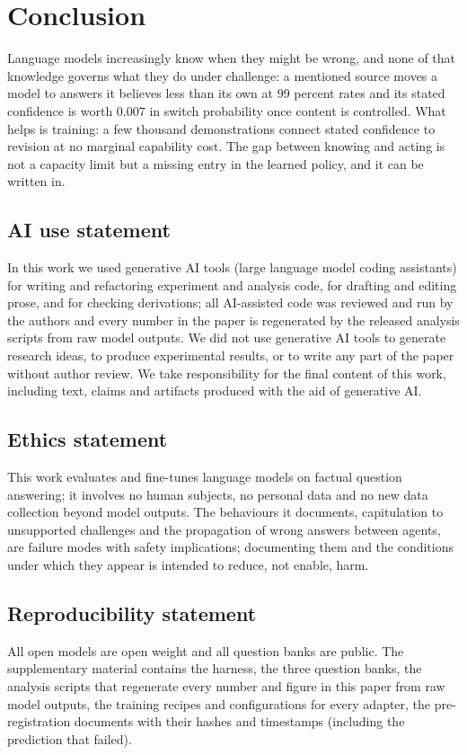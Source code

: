 \documentclass{article}
\begin{document}
\section{Conclusion}
\label{sec:conclusion}
Language models increasingly know when they might be wrong, and none of that knowledge governs what they do under challenge: a mentioned source moves a model to answers it believes less than its own at 99 percent rates and its stated confidence is worth $0.007$ in switch probability once content is controlled. What helps is training: a few thousand demonstrations connect stated confidence to revision at no marginal capability cost. The gap between knowing and acting is not a capacity limit but a missing entry in the learned policy, and it can be written in.


\subsection*{AI use statement}
In this work we used generative AI tools (large language model coding assistants) for writing and refactoring experiment and analysis code, for drafting and editing prose, and for checking derivations; all AI-assisted code was reviewed and run by the authors and every number in the paper is regenerated by the released analysis scripts from raw model outputs. We did not use generative AI tools to generate research ideas, to produce experimental results, or to write any part of the paper without author review. We take responsibility for the final content of this work, including text, claims and artifacts produced with the aid of generative AI.

\subsection*{Ethics statement}
This work evaluates and fine-tunes language models on factual question answering; it involves no human subjects, no personal data and no new data collection beyond model outputs. The behaviours it documents, capitulation to unsupported challenges and the propagation of wrong answers between agents, are failure modes with safety implications; documenting them and the conditions under which they appear is intended to reduce, not enable, harm.

\subsection*{Reproducibility statement}
All open models are open weight and all question banks are public. The supplementary material contains the harness, the three question banks, the analysis scripts that regenerate every number and figure in this paper from raw model outputs, the training recipes and configurations for every adapter, the pre-registration documents with their hashes and timestamps (including the prediction that failed).
\end{document}
